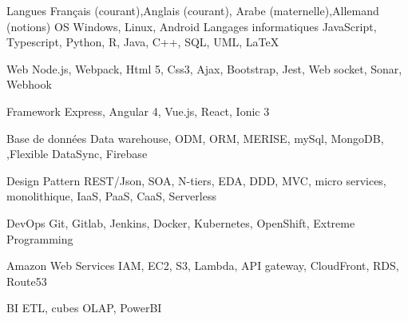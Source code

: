 

\begin{cvskills}
  \cvskill
    {Langues } %
    {Français  (courant),Anglais (courant), Arabe (maternelle),Allemand (notions)} %
  \cvskill
    {OS} %
    {Windows, Linux, Android} %
  \cvskill
    {Langages informatiques} %
    {JavaScript, Typescript, Python, R, Java, C++, SQL, UML, LaTeX} %

  \cvskill
    {Web} %
    {Node.js, Webpack, Html 5, Css3, Ajax, Bootstrap, Jest, Web socket, Sonar, Webhook} %

  \cvskill
    {Framework} %
    {Express, Angular 4, Vue.js, React, Ionic 3} %

  \cvskill
    {Base de données} %
    {Data warehouse, ODM, ORM, MERISE, mySql, MongoDB, ,Flexible DataSync, Firebase } %

  \cvskill
    {Design Pattern} %
    {REST/Json, SOA, N-tiers, EDA, DDD, MVC, micro services, monolithique, IaaS, PaaS, CaaS, Serverless } %

  \cvskill
    {DevOps} %
    {Git, Gitlab, Jenkins, Docker, Kubernetes, OpenShift, Extreme Programming  } %

\cvskill
    {Amazon Web Services} %
    {IAM, EC2, S3, Lambda, API gateway, CloudFront, RDS, Route53 } %

\cvskill
    {BI} %
    {ETL, cubes OLAP, PowerBI } %



\end{cvskills}
